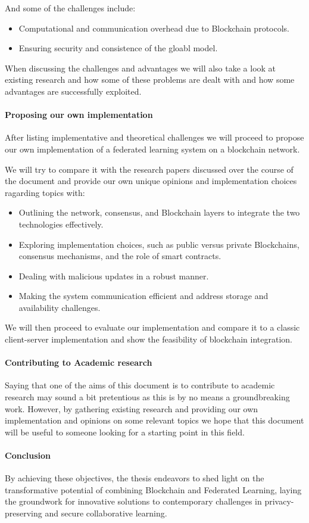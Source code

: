 And some of the challenges include:
\begin{itemize}
  \item Computational and communication overhead due to Blockchain protocols.
  \item Ensuring security and consistence of the gloabl model.
\end{itemize}

When discussing the challenges and advantages we will also take a look at existing
research and how some of these problems are dealt with and how some advantages are successfully exploited.

\paragraph{Proposing our own implementation}
After listing implementative and theoretical challenges we will proceed to propose our own implementation
of a federated learning system on a blockchain network.

We will try to compare it with the research papers discussed over the course of the document and provide our
own unique opinions and implementation choices ragarding topics with:
\begin{itemize}
  \item Outlining the network, consensus, and Blockchain layers to integrate the two
    technologies effectively.
  \item Exploring implementation choices, such as public versus private Blockchains,
    consensus mechanisms, and the role of smart contracts.
  \item Dealing with malicious updates in a robust manner.
  \item Making the system communication efficient and address storage and availability challenges.
\end{itemize}

We will then proceed to evaluate our implementation and compare it to a classic client-server implementation
and show the feasibility of blockchain integration.

\paragraph{Contributing to Academic research}
Saying that one of the aims of this document is to contribute to academic research may sound a bit pretentious
as this is by no means a groundbreaking work. However, by gathering existing research and providing our own
implementation and opinions on some relevant topics we hope that this document will be useful to someone
looking for a starting point in this field.

\paragraph{Conclusion}
By achieving these objectives, the thesis endeavors to shed light on the transformative
potential of combining Blockchain and Federated Learning, laying the groundwork for innovative
solutions to contemporary challenges in privacy-preserving and secure collaborative learning.
